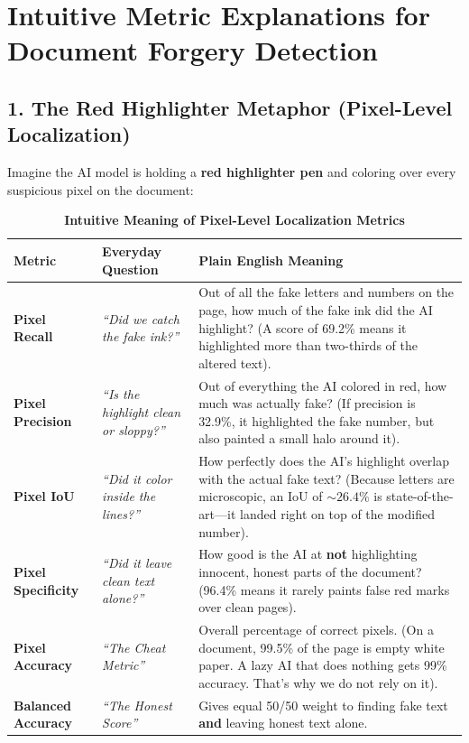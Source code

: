\documentclass[10pt,a4paper]{article}
\begin{document}
\section*{Intuitive Metric Explanations for Document Forgery Detection}

\subsection*{1. The Red Highlighter Metaphor (Pixel-Level Localization)}
Imagine the AI model is holding a \textbf{red highlighter pen} and coloring over every suspicious pixel on the document:

\begin{table}[htbp]
\centering
\small
\caption{\textbf{Intuitive Meaning of Pixel-Level Localization Metrics}}
\label{tab:simple_pixel_metrics}
\vspace{2mm}
\begin{tabularx}{\textwidth}{l p{3.8cm} X}
\toprule
\textbf{Metric} & \textbf{Everyday Question} & \textbf{Plain English Meaning} \\
\midrule
\textbf{Pixel Recall} & \textit{``Did we catch the fake ink?''} & Out of all the fake letters and numbers on the page, how much of the fake ink did the AI highlight? (A score of 69.2\% means it highlighted more than two-thirds of the altered text). \\
\addlinespace
\textbf{Pixel Precision} & \textit{``Is the highlight clean or sloppy?''} & Out of everything the AI colored in red, how much was actually fake? (If precision is 32.9\%, it highlighted the fake number, but also painted a small halo around it). \\
\addlinespace
\textbf{Pixel IoU} & \textit{``Did it color inside the lines?''} & How perfectly does the AI's highlight overlap with the actual fake text? (Because letters are microscopic, an IoU of $\sim 26.4\%$ is state-of-the-art---it landed right on top of the modified number). \\
\addlinespace
\textbf{Pixel Specificity} & \textit{``Did it leave clean text alone?''} & How good is the AI at \textbf{not} highlighting innocent, honest parts of the document? (96.4\% means it rarely paints false red marks over clean pages). \\
\addlinespace
\textbf{Pixel Accuracy} & \textit{``The Cheat Metric''} & Overall percentage of correct pixels. (On a document, 99.5\% of the page is empty white paper. A lazy AI that does nothing gets 99\% accuracy. That's why we do not rely on it). \\
\addlinespace
\textbf{Balanced Accuracy} & \textit{``The Honest Score''} & Gives equal 50/50 weight to finding fake text \textbf{and} leaving honest text alone. \\
\bottomrule
\end{tabularx}
\end{table}
\end{document}
